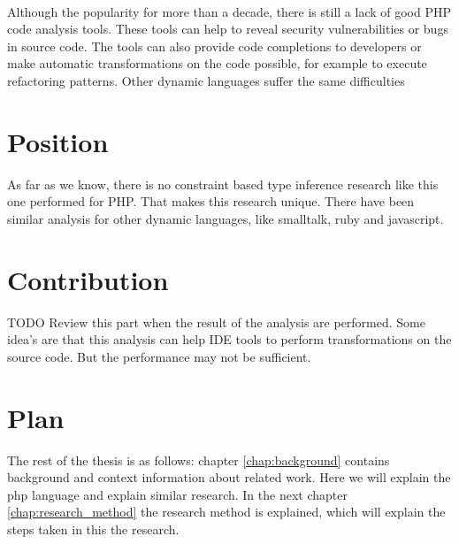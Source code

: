 \documentclass[../main.tex]{subfiles}
\begin{document}
        \paragraph{}%
        Although the popularity for more than a decade, there is still a lack of good PHP code analysis tools.
        These tools can help to reveal security vulnerabilities or bugs in source code.
        The tools can also provide code completions to developers or make automatic transformations on the code possible, for example to execute refactoring patterns.
        Other dynamic languages suffer the same difficulties
        
    \section{Position} %
        As far as we know, there is no constraint based type inference research like this one performed for PHP.
        That makes this research unique.
        There have been similar analysis for other dynamic languages, like smalltalk, ruby and javascript.
       
    \section{Contribution} %
        TODO Review this part when the result of the analysis are performed.
        Some idea's are that this analysis can help IDE tools to perform transformations on the source code.
        But the performance may not be sufficient.
    
    \section{Plan} %
        The rest of the thesis is as follows:
        chapter \ref{chap:background} contains background and context information about related work.
        Here we will explain the php language and explain similar research.
        In the next chapter \ref{chap:research_method} the research method is explained, which will explain the steps taken in this the research.
        
\end{document}
